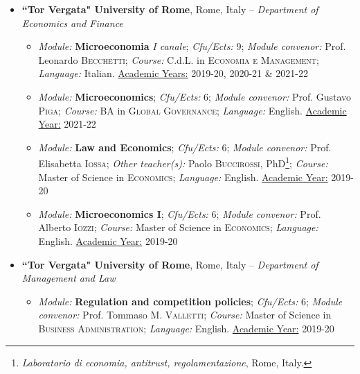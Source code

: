\documentclass{article}
\begin{document}
\begin{itemize}

	\item	\textbf{``Tor Vergata" University of Rome}, Rome, Italy --  \textit{Department of Economics and Finance}
	\begin{itemize}
 		\item \emph{Module:} \textbf{Microeconomia} \emph{I canale}; \emph{Cfu/Ects:} 9; \emph{Module convenor:} Prof. Leonardo \textsc{Becchetti}; \emph{Course:} C.d.L. in \textsc{Economia e Management}; \emph{Language:} Italian. \underline{Academic Years:} 2019-20, 2020-21 \& 2021-22
            \item \emph{Module:} \textbf{Microeconomics}; \emph{Cfu/Ects:} 6; \emph{Module convenor:} Prof. Gustavo \textsc{Piga}; \emph{Course:} BA in \textsc{Global Governance}; \emph{Language:} English. \underline{Academic Year:} 2021-22
		\item \emph{Module:} \textbf{Law and Economics}; \emph{Cfu/Ects:} 6; \emph{Module convenor:} Prof. Elisabetta \textsc{Iossa}; \emph{Other teacher(s):} Paolo \textsc{Buccirossi}, PhD\footnote{\emph{Laboratorio di economia, antitrust, regolamentazione}, Rome, Italy.}; \emph{Course:} Master of Science in \textsc{Economics}; \emph{Language:} English. \underline{Academic Year:} 2019-20

		\item \emph{Module:} \textbf{Microeconomics I}; \emph{Cfu/Ects:} 6; \emph{Module convenor:} Prof. Alberto \textsc{Iozzi}; \emph{Course:} Master of Science in \textsc{Economics}; \emph{Language:} English. \underline{Academic Year:} 2019-20

	\end{itemize}

	\item \textbf{``Tor Vergata" University of Rome}, Rome, Italy --  \textit{Department of Management and Law}
	\begin{itemize}
		\item \emph{Module:} \textbf{Regulation and competition policies}; \emph{Cfu/Ects:} 6; \emph{Module convenor:} Prof. Tommaso M. \textsc{Valletti}; \emph{Course:} Master of Science in \textsc{Business Administration}; \emph{Language:} English. \underline{Academic Year:} 2019-20
	\end{itemize}

\end{itemize}
\end{document}
